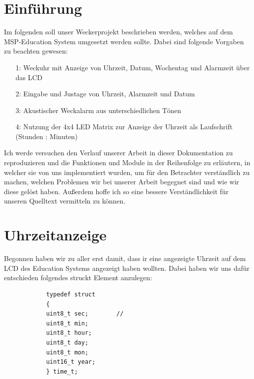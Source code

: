 \documentclass[openright,twoside,11pt,a4paper]{scrartcl}
\begin{document}
	\begin{flushleft}
		\section{Einführung}
		Im folgenden soll unser Weckerprojekt beschrieben werden, welches auf dem MSP-Education System umgesetzt werden sollte. Dabei sind folgende Vorgaben zu beachten gewesen:\\
		\begin{itemize}
			\item[1:] Weckuhr mit Anzeige von Uhrzeit, Datum, Wochentag und Alarmzeit über das LCD
			\item[2:] Eingabe und Justage von Uhrzeit, Alarmzeit und Datum
			\item[3:] Akustischer Weckalarm aus unterschiedlichen Tönen
			\item[4:] Nutzung der 4x4 LED Matrix zur Anzeige der Uhrzeit als Laufschrift (Stunden : Minuten)
		\end{itemize}
		Ich werde versuchen den Verlauf unserer Arbeit in dieser Dokumentation zu reproduzieren und die Funktionen und Module in der Reihenfolge zu erläutern, in welcher sie von uns implementiert wurden, um für den Betrachter verständlich zu machen, welchen Problemen wir bei unserer Arbeit begegnet sind und wie wir diese gelöst haben. Außerdem hoffe ich so eine bessere Verständlichkeit für unseren Quelltext vermitteln zu können. 
		\section{Uhrzeitanzeige}
		Begonnen haben wir zu aller erst damit, dass ir eine angezeigte Uhrzeit auf dem LCD des Education Systems angezeigt haben wollten. Dabei haben wir uns dafür entschieden folgendes struckt Element anzulegen:
		\begin{lstlisting}
			typedef struct
			{
			uint8_t sec;		//
			uint8_t min;
			uint8_t hour;
			uint8_t day;
			uint8_t mon;
			uint16_t year;
			} time_t;
			

\end{lstlisting}
\end{flushleft}
\end{document}
